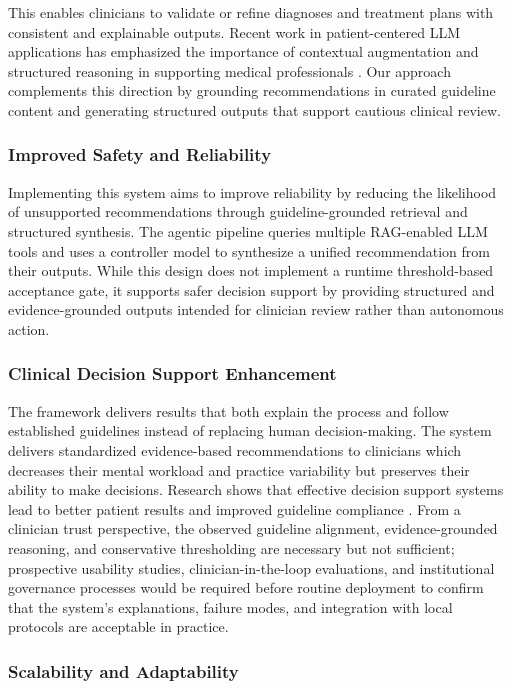 \documentclass[preprint,12pt]{elsarticle}
\begin{document}
This enables clinicians to validate or refine diagnoses and treatment plans with consistent and explainable outputs. Recent work in patient-centered LLM applications has emphasized the importance of contextual augmentation and structured reasoning in supporting medical professionals \cite{Neupane2025, MACIA2024147}. Our approach complements this direction by grounding recommendations in curated guideline content and generating structured outputs that support cautious clinical review.


\subsubsection{Improved Safety and Reliability}

Implementing this system aims to improve reliability by reducing the likelihood of unsupported recommendations through guideline-grounded retrieval and structured synthesis. The agentic pipeline queries multiple RAG-enabled LLM tools and uses a controller model to synthesize a unified recommendation from their outputs. While this design does not implement a runtime threshold-based acceptance gate, it supports safer decision support by providing structured and evidence-grounded outputs intended for clinician review rather than autonomous action.

\subsubsection{Clinical Decision Support Enhancement}

The framework delivers results that both explain the process and follow established guidelines instead of replacing human decision-making. The system delivers standardized evidence-based recommendations to clinicians which decreases their mental workload and practice variability but preserves their ability to make decisions. Research shows that effective decision support systems lead to better patient results and improved guideline compliance \cite{r34, XU2023130}. From a clinician trust perspective, the observed guideline alignment, evidence-grounded reasoning, and conservative thresholding are necessary but not sufficient; prospective usability studies, clinician-in-the-loop evaluations, and institutional governance processes would be required before routine deployment to confirm that the system's explanations, failure modes, and integration with local protocols are acceptable in practice.

\subsubsection{Scalability and Adaptability}
\end{document}
